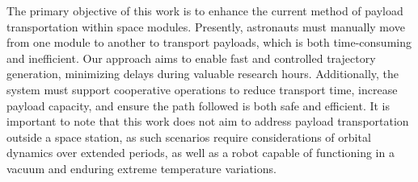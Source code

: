 The primary objective of this work is to enhance the current method of payload transportation within space modules. Presently, astronauts must manually move from one module to another to transport payloads, which is both time-consuming and inefficient. Our approach aims to enable fast and controlled trajectory generation, minimizing delays during valuable research hours. Additionally, the system must support cooperative operations to reduce transport time, increase payload capacity, and ensure the path followed is both safe and efficient. It is important to note that this work does not aim to address payload transportation outside a space station, as such scenarios require considerations of orbital dynamics over extended periods, as well as a robot capable of functioning in a vacuum and enduring extreme temperature variations.
